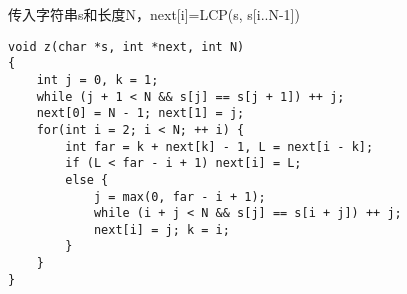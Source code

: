 传入字符串s和长度N，next[i]=LCP(s, s[i..N-1])
\begin{lstlisting}
void z(char *s, int *next, int N)
{
	int j = 0, k = 1;
	while (j + 1 < N && s[j] == s[j + 1]) ++ j;
	next[0] = N - 1; next[1] = j;
	for(int i = 2; i < N; ++ i) {
		int far = k + next[k] - 1, L = next[i - k];
		if (L < far - i + 1) next[i] = L;
		else {
			j = max(0, far - i + 1);
			while (i + j < N && s[j] == s[i + j]) ++ j;
			next[i] = j; k = i;
		}
	}
}
\end{lstlisting}

